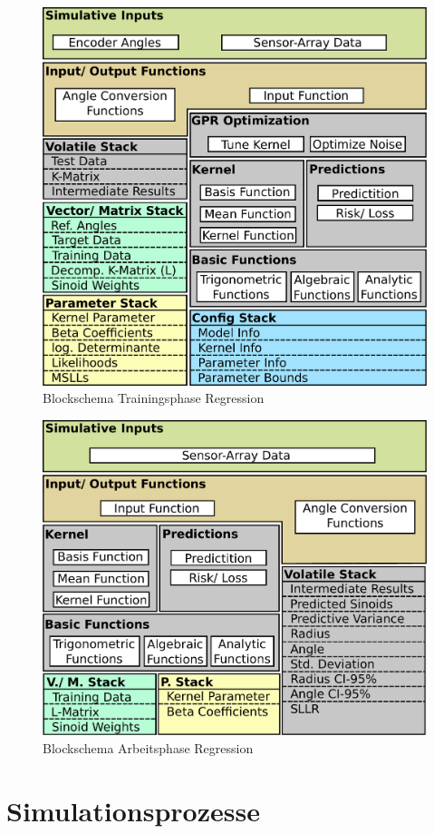 \begin{figure}[tbph]
	\centering
	\includegraphics[width=0.7\linewidth]{chapters/images/3-SW-E-OExp/Blockschema_Trainingsphase}
	\caption[Blockschema Trainingsphase Regression]{Blockschema Trainingsphase Regression}
	\label{fig:blockschematrainingsphase}
\end{figure}

\begin{figure}[tbph]
	\centering
	\includegraphics[width=0.7\linewidth]{chapters/images/3-SW-E-OExp/Blockschema_Workphase}
	\caption[Blockschema Arbeitsphase Regression]{Blockschema Arbeitsphase Regression}
	\label{fig:blockschemaworkphase}
\end{figure}


\clearpage


\section{Simulationsprozesse}\label{sec:sim-pro}


